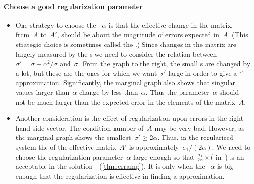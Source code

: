 \paragraph{Choose a good regularization parameter}
\begin{itemize}
\item 
\begin{figbox}{}
One strategy to choose the ~\(\alpha\) is that the effective change in the matrix, from~\(A\) to~\(A'\), should be about the magnitude of errors expected in~\(A\).
(This strategic choice is sometimes called the  \cite[\S7]{Kress2015}.)
Since changes in the matrix are largely measured by the s we need to consider the relation between \(\sigma'=\sigma+\alpha^2/\sigma\) and~\(\sigma\).
From the graph to the right, the small s are changed by a lot, but these are the ones for which we want~\(\sigma'\) large in order to give a `' approximation.
Significantly, the marginal graph also shows that singular values larger than~\(\alpha\) change by less than~\(\alpha\).
Thus the parameter~\(\alpha\) should not be much larger than the expected error in the elements of the matrix~\(A\).
\end{figbox}

\item Another consideration is the effect of regularization upon errors in the right-hand side vector.
The condition number of~\(A\) may be very bad.
However, as the marginal graph shows the smallest~\(\sigma'\geq2\alpha\).
Thus, in the regularized system the  of the effective matrix~\(A'\) is approximately~\(\sigma_1/(2\alpha)\).
We need to choose the regularization parameter~\(\alpha\) large enough so that \(\frac{\sigma_1}{2\alpha}\times\)( in~\bv) is an acceptable  in the solution~\xv\ (\cref{thm:erramp}).
It is only when the ~\(\alpha\) is big enough that the regularization is effective in finding a  approximation. 

\end{itemize}



